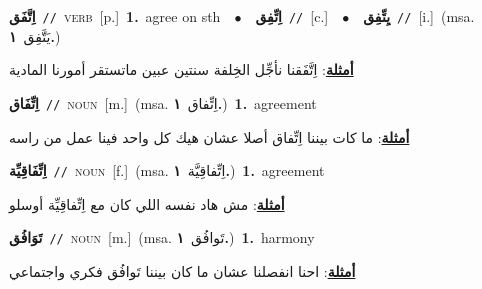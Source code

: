 \documentclass[10pt,a4paper,twoside]{article} %
\begin{document}
\begin{multicols}{2}
{\setlength\topsep{0pt}\textbf{\foreignlanguage{arabic}{اِتَّفَق}}\ {\color{gray}\texttt{//}\color{black}}\ \textsc{verb}\ [p.]\ \textbf{1.}~agree on sth\ \ $\bullet$\ \ \setlength\topsep{0pt}\textbf{\foreignlanguage{arabic}{اِتِّفِق}}\ {\color{gray}\texttt{//}\color{black}}\ [c.]\ \ $\bullet$\ \ \setlength\topsep{0pt}\textbf{\foreignlanguage{arabic}{يِتِّفِق}}\ {\color{gray}\texttt{//}\color{black}}\ [i.]\ \color{gray}(msa. \foreignlanguage{arabic}{يَتَّفِق}~\foreignlanguage{arabic}{\textbf{١.}})\color{black}\  \begin{flushright}\color{gray}\foreignlanguage{arabic}{\textbf{\underline{\foreignlanguage{arabic}{أمثلة}}}: اِتَّفَقنا نأجِّل الخِلفة سنتين عبين ماتستقر أمورنا المادية}\end{flushright}\color{black}} \vspace{2mm}

{\setlength\topsep{0pt}\textbf{\foreignlanguage{arabic}{اِتِّفَاق}}\ {\color{gray}\texttt{//}\color{black}}\ \textsc{noun}\ [m.]\ \color{gray}(msa. \foreignlanguage{arabic}{اِتِّفاق}~\foreignlanguage{arabic}{\textbf{١.}})\color{black}\ \textbf{1.}~agreement\  \begin{flushright}\color{gray}\foreignlanguage{arabic}{\textbf{\underline{\foreignlanguage{arabic}{أمثلة}}}: ما كات بيننا اِتِّفاق أصلا عشان هيك كل واحد فينا عمل من راسه}\end{flushright}\color{black}} \vspace{2mm}

{\setlength\topsep{0pt}\textbf{\foreignlanguage{arabic}{اِتِّفَاقِيِّة}}\ {\color{gray}\texttt{//}\color{black}}\ \textsc{noun}\ [f.]\ \color{gray}(msa. \foreignlanguage{arabic}{اِتِّفاقِيَّة}~\foreignlanguage{arabic}{\textbf{١.}})\color{black}\ \textbf{1.}~agreement\  \begin{flushright}\color{gray}\foreignlanguage{arabic}{\textbf{\underline{\foreignlanguage{arabic}{أمثلة}}}: مش هاد نفسه اللي كان مع اِتِّفاقِيِّة أوسلو}\end{flushright}\color{black}} \vspace{2mm}

{\setlength\topsep{0pt}\textbf{\foreignlanguage{arabic}{تَوَافُق}}\ {\color{gray}\texttt{//}\color{black}}\ \textsc{noun}\ [m.]\ \color{gray}(msa. \foreignlanguage{arabic}{تَوافُق}~\foreignlanguage{arabic}{\textbf{١.}})\color{black}\ \textbf{1.}~harmony\  \begin{flushright}\color{gray}\foreignlanguage{arabic}{\textbf{\underline{\foreignlanguage{arabic}{أمثلة}}}: احنا انفصلنا عشان ما كان بيننا تَوافُق فكري واجتماعي}\end{flushright}\color{black}} \vspace{2mm}


\end{multicols}
\end{document}
